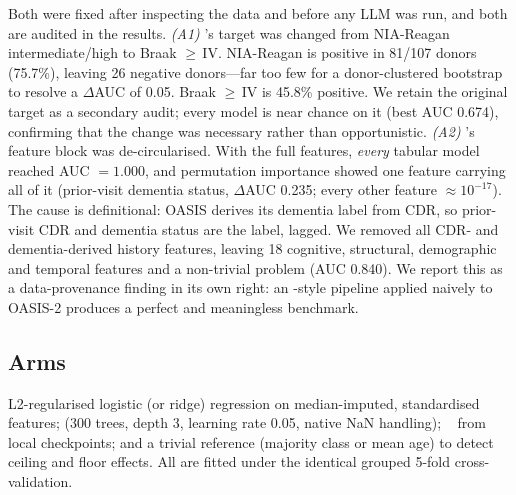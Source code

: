  Both were fixed after inspecting the data and before any
LLM was run, and both are audited in the results. \emph{(A1)} \taskone's target was changed from
NIA-Reagan intermediate/high to Braak $\geq$\,IV. NIA-Reagan is positive in 81/107 donors (75.7\%),
leaving 26 negative donors---far too few for a donor-clustered bootstrap to resolve a
$\Delta$AUC of 0.05. Braak $\geq$\,IV is 45.8\% positive. We retain the original target as a
secondary audit; every model is near chance on it (best AUC 0.674), confirming that the change was
necessary rather than opportunistic. \emph{(A2)} \taskthree's feature block was de-circularised.
With the full \ltoc features, \emph{every} tabular model reached AUC $=1.000$, and permutation
importance showed one feature carrying all of it (prior-visit dementia status, $\Delta$AUC 0.235;
every other feature $\approx 10^{-17}$). The cause is definitional: OASIS derives its dementia label
from CDR, so prior-visit CDR and dementia status are the label, lagged. We removed all CDR- and
dementia-derived history features, leaving 18 cognitive, structural, demographic and temporal
features and a non-trivial problem (\xgb AUC 0.840). We report this as a data-provenance finding in
its own right: an \ltoc-style pipeline applied naively to OASIS-2 produces a perfect and meaningless
benchmark.

\subsection{Arms}
\label{sec:method:arms}

 L2-regularised logistic (or ridge) regression on median-imputed,
standardised features; \xgb (300 trees, depth 3, learning rate 0.05, native NaN handling);
\tabpfn~\citep{hollmann2023tabpfn} from local checkpoints; and a trivial reference (majority class
or mean age) to detect ceiling and floor effects. All are fitted under the identical grouped 5-fold
cross-validation.

